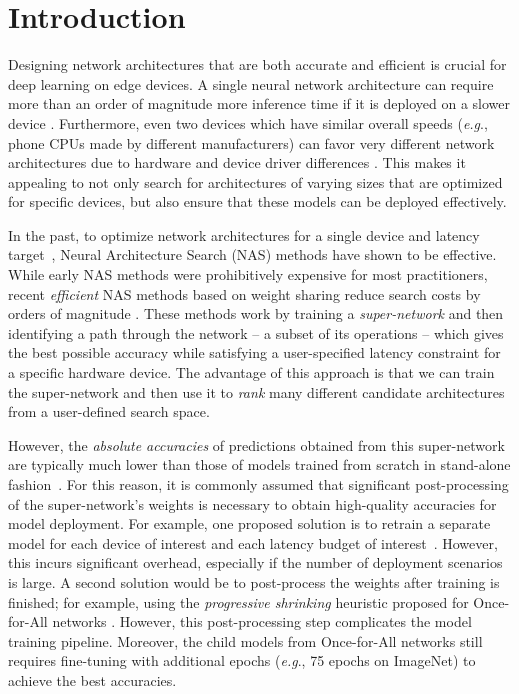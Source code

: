 \documentclass[runningheads]{llncs}
\def\onedot{.}
\def\eg{\emph{e.g}\onedot} \def\Eg{\emph{E.g}\onedot}
\begin{document}
\section{Introduction}
Designing network architectures that are both accurate and efficient is crucial for deep learning on edge devices. A single neural network architecture can require more than an order of magnitude more inference time if it is deployed on a slower device \cite{yu2018slimmable}. Furthermore, even two devices which have similar overall speeds (\eg, phone CPUs made by different manufacturers) can favor very different network architectures due to hardware and device driver differences \cite{wu2019fbnet}. This makes it appealing to not only search for architectures of varying sizes that are optimized for specific devices, but also ensure that these models can be deployed effectively.

In the past, to optimize network architectures for a single device and latency target~\cite{tan2018mnasnet}, Neural Architecture Search (NAS) methods \cite{zoph2016neural,zoph2018learning,real2018regularized} have shown to be effective. While early NAS methods were prohibitively expensive for most practitioners, recent \emph{efficient} NAS methods based on weight sharing  reduce search costs by orders of magnitude \cite{pham2018efficient,bender2018understanding,liu2018darts,yu2019network}. These methods work by training a \emph{super-network} and then identifying a path through the network -- a subset of its operations -- which gives the best possible accuracy while satisfying a user-specified latency constraint for a specific hardware device. The advantage of this approach is that we can train the super-network and then use it to \textit{rank} many different candidate architectures from a user-defined search space.

However, the \textit{absolute accuracies} of predictions obtained from this super-network are typically much lower than those of models trained from scratch in stand-alone fashion~\cite{bender2018understanding}. For this reason, it is commonly assumed that significant post-processing of the super-network's weights is necessary to obtain high-quality accuracies for model deployment. For example, one proposed solution is to retrain a separate model for each device of interest and each latency budget of interest~\cite{wu2019fbnet, cai2018proxylessnas}. However, this incurs significant overhead, especially if the number of deployment scenarios is large. A second solution would be to post-process the weights after training is finished; for example, using the \textit{progressive shrinking} heuristic proposed for Once-for-All networks \cite{cai2019once}. However, this post-processing step complicates the model training pipeline. Moreover, the child models from Once-for-All networks \cite{cai2019once} still requires fine-tuning with additional epochs (\eg, 75 epochs on ImageNet) to achieve the best accuracies.
\end{document}
